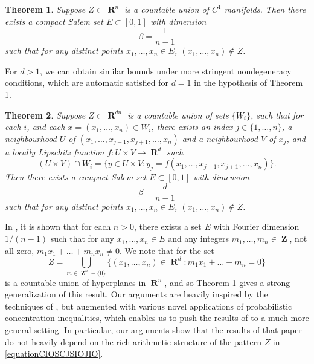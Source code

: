 \documentclass[12pt,reqno]{article}
\numberwithin{equation}{section}
\DeclareMathOperator{\RR}{\mathbf{R}}
\DeclareMathOperator{\ZZ}{\mathbf{Z}}
\newtheorem{theorem}{Theorem}
\numberwithin{theorem}{section}
\begin{document}
\begin{theorem} \label{theoremJOICVIOJVI122}
    Suppose $Z \subset \RR^n$ is a countable union of $C^1$ manifolds. Then there exists a compact Salem set $E \subset [0,1]$ with dimension
    \[ \beta = \frac{1}{n-1} \]
    such that for any distinct points $x_1, \dots, x_n \in E$, $(x_1, \dots, x_n) \not \in Z$.
\end{theorem}

For $d > 1$, we can obtain similar bounds under more stringent nondegeneracy conditions, which are automatic satisfied for $d = 1$ in the hypothesis of Theorem \ref{theoremJOICVIOJVI122}.

\begin{theorem} \label{TheoremGGHSDIOCJOIJ}
    Suppose $Z \subset \RR^{dn}$ is a countable union of sets $\{ W_i \}$, such that for each $i$, and each $x = (x_1,\dots,x_n) \in W_i$, there exists an index $j \in \{ 1,\dots, n \}$, a neighbourhood $U$ of $(x_1,\dots,x_{j-1},x_{j+1},\dots,x_n)$ and a neighbourhood $V$ of $x_j$, and a locally Lipschitz function $f: U \times V \to \RR^d$ such
    \[ (U \times V) \cap W_i = \{ y \in U \times V : y_j = f(x_1,\dots,x_{j-1},x_{j+1},\dots,x_n) \}. \]
    Then there exists a compact Salem set $E \subset [0,1]$ with dimension
    \[ \beta = \frac{d}{n-1} \]
    such that for any distinct points $x_1, \dots, x_n \in E$, $(x_1, \dots, x_n) \not \in Z$.
\end{theorem}

In \cite{Korner2}, it is shown that for each $n > 0$, there exists a set $E$ with Fourier dimension $1/(n-1)$ such that for any $x_1,\dots,x_n \in E$ and any integers $m_1,\dots,m_n \in \ZZ$, not all zero, $m_1x_1 + \dots + m_nx_n \neq 0$. We note that for the set
%
\begin{equation} \label{equationCIOSCJSIOJIO}
    Z = \bigcup_{m \in \ZZ^n - \{ 0 \}} \{ (x_1,\dots,x_n) \in \RR^d: m_1x_1 + \dots + m_n = 0 \}
\end{equation}
%
is a countable union of hyperplanes in $\RR^n$, and so Theorem \ref{theoremJOICVIOJVI122} gives a strong generalization of this result. Our arguments are heavily inspired by the techniques of \cite{Korner2}, but augmented with various novel applications of probabilistic concentration inequalities, which enables us to push the results of \cite{Korner2} to a much more general setting. In particular, our arguments show that the results of that paper do not heavily depend on the rich arithmetic structure of the pattern $Z$ in \eqref{equationCIOSCJSIOJIO}.
\end{document}
